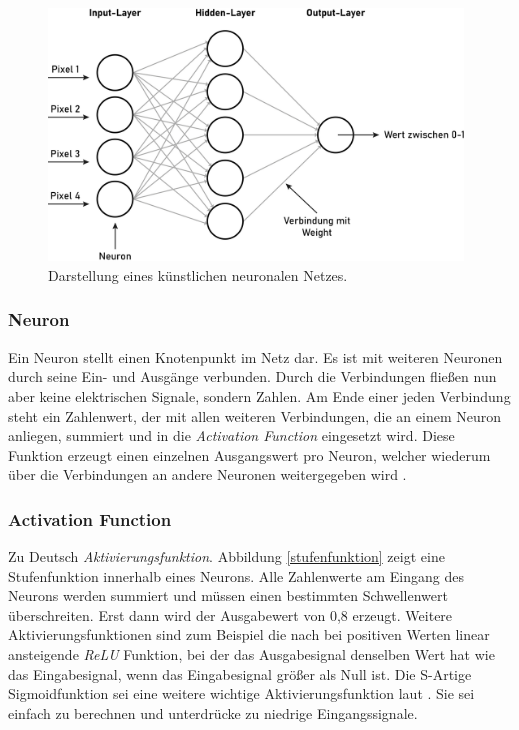 \begin{figure}[ht]
    \centering
    \includegraphics[width=11cm]{bilder/kuentlNetz.jpg}
    \caption{Darstellung eines künstlichen neuronalen Netzes.}
    \label{neuronalesnetz}
\end{figure}

\subsubsection*{Neuron} Ein Neuron stellt einen Knotenpunkt im Netz dar. Es ist mit weiteren Neuronen durch seine Ein- und Ausgänge verbunden. Durch die Verbindungen fließen nun aber keine elektrischen Signale, sondern Zahlen. Am Ende einer jeden Verbindung steht ein Zahlenwert, der mit allen weiteren Verbindungen, die an einem Neuron anliegen, summiert und in die \textit{Activation Function} eingesetzt wird. Diese Funktion erzeugt einen einzelnen Ausgangswert pro Neuron, welcher wiederum über die Verbindungen an andere Neuronen weitergegeben wird \parencite[S. 40]{traiq_neuron}.

\subsubsection*{Activation Function} Zu Deutsch \textit{Aktivierungsfunktion}. Abbildung \ref{stufenfunktion} zeigt eine Stufenfunktion innerhalb eines Neurons. Alle Zahlenwerte am Eingang des Neurons werden summiert und müssen einen bestimmten Schwellenwert überschreiten. Erst dann wird der Ausgabewert von 0,8 erzeugt. Weitere Aktivierungsfunktionen sind zum Beispiel die nach \citet{Hahnloser2000} bei positiven Werten linear ansteigende \textit{ReLU} Funktion, bei der das Ausgabesignal denselben Wert hat wie das Eingabesignal, wenn das Eingabesignal größer als Null ist. Die S-Artige Sigmoidfunktion sei eine weitere wichtige Aktivierungsfunktion laut \citet[S. 34]{traiq_neuron}. Sie sei einfach zu berechnen und unterdrücke zu niedrige Eingangssignale.


